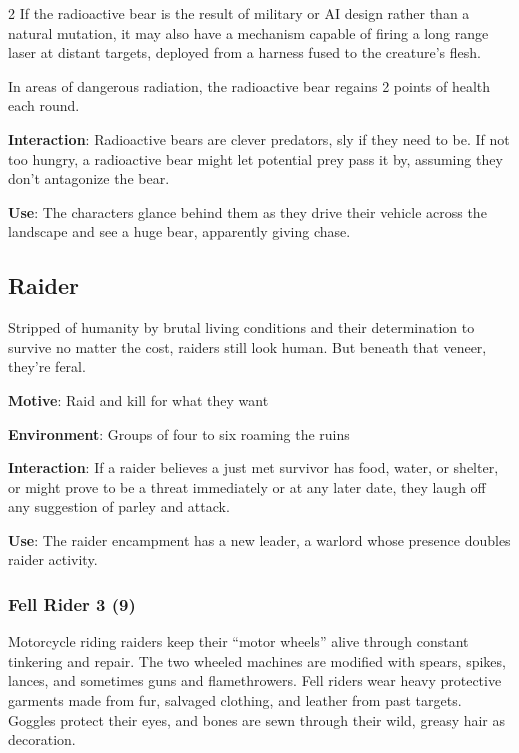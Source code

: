 \begin{multicols}{2}
If the radioactive bear is the result of military or AI design rather than a natural mutation, it may also have a mechanism capable of firing a long range laser at distant targets, deployed from a harness fused to the creature’s flesh. 

In areas of dangerous radiation, the radioactive bear regains 2 points of health each round. 

\textbf{Interaction}: Radioactive bears are clever predators, sly if they need to be. If not too hungry, a radioactive bear might let potential prey pass it by, assuming they don’t antagonize the bear. 

\textbf{Use}: The characters glance behind them as they drive their vehicle across the landscape and see a huge bear, apparently giving chase. 

\subsection{Raider}

Stripped of humanity by brutal living conditions and their determination to survive no matter the cost, raiders still look human. But beneath that veneer, they’re feral.

\textbf{Motive}: Raid and kill for what they want 

\textbf{Environment}: Groups of four to six roaming the ruins 

\textbf{Interaction}: If a raider believes a just met survivor has food, water, or shelter, or might prove to be a threat immediately or at any later date, they laugh off any suggestion of parley and attack. 

\textbf{Use}: The raider encampment has a new leader, a warlord whose presence doubles raider activity.

\subsubsection{Fell Rider 3 (9)}

Motorcycle riding raiders keep their “motor wheels” alive through constant tinkering and repair. The two wheeled machines are modified with spears, spikes, lances, and sometimes guns and flamethrowers. Fell riders wear heavy protective garments made from fur, salvaged clothing, and leather from past targets. Goggles protect their eyes, and bones are sewn through their wild, greasy hair as decoration.


\end{multicols}
